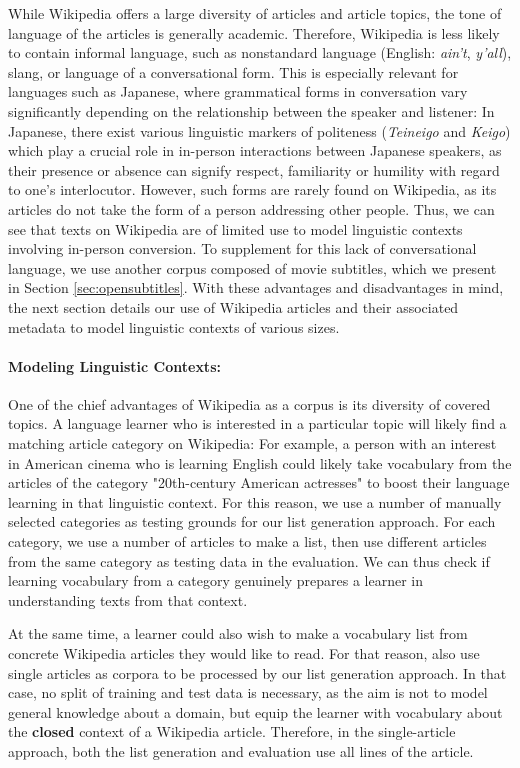 While Wikipedia offers a large diversity of articles and article topics, the tone of language of the articles is generally academic.
Therefore, Wikipedia is less likely to contain informal language, such as nonstandard language (English: \textit{ain't}, \textit{y'all}), slang, or language of a conversational form.
This is especially relevant for languages such as Japanese, where grammatical forms in conversation vary significantly depending on the relationship between the speaker and listener:
In Japanese, there exist various linguistic markers of politeness (\textit{Teineigo} and \textit{Keigo}) which play a crucial role in in-person interactions between Japanese speakers, as their presence or absence can signify respect, familiarity or humility with regard to one's interlocutor.
However, such forms are rarely found on Wikipedia, as its articles do not take the form of a person addressing other people.
Thus, we can see that texts on Wikipedia are of limited use to model linguistic contexts involving in-person conversion.
To supplement for this lack of conversational language, we use another corpus composed of movie subtitles, which we present in Section \ref{sec:opensubtitles}.
With these advantages and disadvantages in mind, the next section details our use of Wikipedia articles and their associated metadata to model linguistic contexts of various sizes.

\paragraph{Modeling Linguistic Contexts:}

One of the chief advantages of Wikipedia as a corpus is its diversity of covered topics.
A language learner who is interested in a particular topic will likely find a matching article category on Wikipedia:
For example, a person with an interest in American cinema who is learning English could likely take vocabulary from the articles of the category "20th-century American actresses" to boost their language learning in that linguistic context.
For this reason, we use a number of manually selected categories as testing grounds for our list generation approach.
For each category, we use a number of articles to make a list, then use different articles from the same category as testing data in the evaluation.
We can thus check if learning vocabulary from a category genuinely prepares a learner in understanding texts from that context.

At the same time, a learner could also wish to make a vocabulary list from concrete Wikipedia articles they would like to read.
For that reason, also use single articles as corpora to be processed by our list generation approach.
In that case, no split of training and test data is necessary, as the aim is not to model general knowledge about a domain, but equip the learner with vocabulary about the \textbf{closed} context of a Wikipedia article.
Therefore, in the single-article approach, both the list generation and evaluation use all lines of the article.


